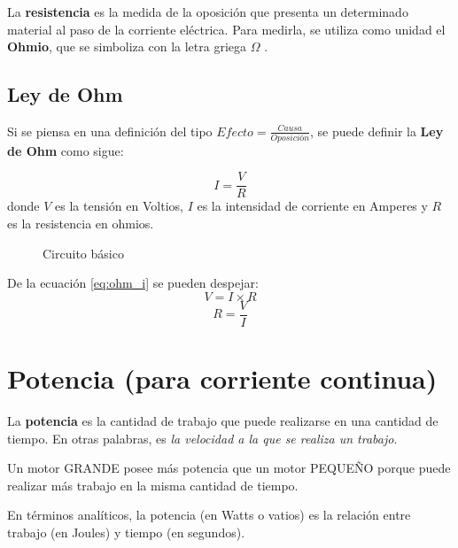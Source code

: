 La \textbf{resistencia} es la medida de la oposición que presenta un determinado material al paso de la corriente eléctrica. Para medirla, se utiliza como unidad el \textbf{Ohmio}, que se simboliza con la letra griega $\Omega$ .
\subsection{Ley de Ohm}
Si se piensa en una definición del tipo $ \textit{Efecto} = \frac{\textit{Causa}}{\textit{Oposición}}$, se puede definir la \textbf{Ley de Ohm} como sigue:

\begin{equation}
	\label{eq:ohm_i}
	I=\frac{V}{R}
\end{equation}
donde $V$ es la tensión en Voltios, $I$ es la intensidad de corriente en Amperes y $R$ es la resistencia en ohmios.

\begin{figure}[h]
	\label{gr:ohm}
	\caption{Circuito básico}
	
%
%

\end{figure}

De la ecuación \ref{eq:ohm_i} se pueden despejar:
\begin{equation}
	\label{eq:ohm_v}
	V=I \times R
\end{equation}
\begin{equation}
	\label{eq:ohm_r}
	R=\frac{V}{I}
\end{equation}
\section{Potencia (para corriente continua)}
La \textbf{potencia} es la cantidad de trabajo que puede realizarse en una cantidad de tiempo. En otras palabras, es \textit{la velocidad a la que se realiza un trabajo}.

\begin{ejemplo}
	Un motor GRANDE posee más potencia que un motor PEQUEÑO porque puede realizar más trabajo en la misma cantidad de tiempo.
\end{ejemplo}

En términos analíticos, la potencia (en Watts o vatios) es la relación entre trabajo (en Joules) y tiempo (en segundos).

